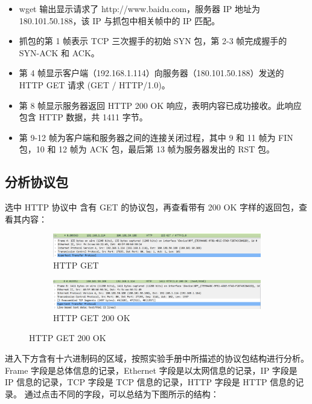 \documentclass[14pt,a4paper,UTF8,twoside]{article}
\begin{document}
\begin{itemize}
  \item wget 输出显示请求了 http://www.baidu.com，服务器 IP 地址为 180.101.50.188，该 IP 与抓包中相关帧中的 IP 匹配。
  \item 抓包的第 1 帧表示 TCP 三次握手的初始 SYN 包，第 2-3 帧完成握手的 SYN-ACK 和 ACK。
  \item 第 4 帧显示客户端（192.168.1.114）向服务器（180.101.50.188）发送的 HTTP GET 请求 (GET / HTTP/1.0)。
  \item 第 8 帧显示服务器返回 HTTP 200 OK 响应，表明内容已成功接收。此响应包含 HTTP 数据，共 1411 字节。
  \item 第 9-12 帧为客户端和服务器之间的连接关闭过程，其中 9 和 11 帧为 FIN 包，10 和 12 帧为 ACK 包，最后第 13 帧为服务器发出的 RST 包。
\end{itemize}

\subsection{分析协议包}

选中 HTTP 协议中 含有 GET 的协议包，再查看带有 200 OK 字样的返回包，查看其内容：

\begin{figure}[H]
  \centering
  \begin{subfigure}{0.8\textwidth}
    \centering
    \includegraphics[width=\textwidth]{lab1/getcontent.png}
    \caption{HTTP GET}
  \end{subfigure}
  
  \begin{subfigure}{0.8\textwidth}
    \centering
    \includegraphics[width=\textwidth]{lab1/getcontentok.png}
    \caption{HTTP GET 200 OK}
  \end{subfigure}
\end{figure}

进入下方含有十六进制码的区域，按照实验手册中所描述的协议包结构进行分析。
Frame 字段是总体信息的记录，Ethernet 字段是以太网信息的记录，IP 字段是 IP 信息的记录，TCP 字段是 TCP 信息的记录，HTTP 字段是 HTTP 信息的记录。
通过点击不同的字段，可以总结为下图所示的结构：
\end{document}

